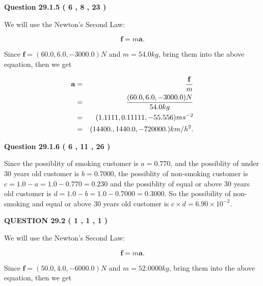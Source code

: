 \documentclass[12pt]{article}
\begin{document}
 
 
  
\vspace{0.2in}
  
{\textbf{\Large{Question
29.1.5 
 (           6 ,           8 ,          23 )
}}}
  
  
 
 

We will use the Newton's Second Law:
 
\[
\mathbf{f}=m\mathbf{a}.
\]
 
Since $\mathbf{f}=( %
60.0,  %
6.0,  %
-3000.0 )N$
and $m= %
54.0kg$, bring them into the above equation, then we get
 
\begin{eqnarray*}
\mathbf{a}&=&\frac{\mathbf{f}}m  \\
&=&\frac{(
60.0 ,
6.0 ,
-3000.0 )N
}{ %
54.0 kg}  \\
&=&(
1.1111 ,
0.11111,
-55.556
)ms^{-2} \\
&=&(
14400. ,
1440.0 ,
-720000.
)km/h^2.
\end{eqnarray*}
 
 
 
  
\vspace{0.2in}
  
{\textbf{\Large{Question
29.1.6 
 (           6 ,          11 ,          26 )
}}}
  
  
 
 

Since the possiblity of  %
smoking customer is $ a =  %
0.770 $,
and the possiblity of  %
 under 30 years old customer is $ b =  %
0.7000 $,
the possiblity of  %
non-smoking customer is $ c = 1.0 - a = 1.0 -
0.770
=  %
0.230 $ and the possiblity of  %
equal or above 30 years old
customer is $ d = 1.0 - b = 1.0 -  %
0.7000 =  %
0.3000  $.
So the possibility of  %
 non-smoking and  %
equal or above 30 years old
customer is $ c \times d =  %
6.90 \times 10^{-2} $.
 
 
 
  
\vspace{0.2in}
  
{\textbf{\Large{QUESTION
29.2 
 (           1 ,           1 ,           1 )
}}}
  
  


 
 

We will use the Newton's Second Law:
 
\[
\mathbf{f}=m\mathbf{a}.
\]
 
Since $\mathbf{f}= %
(50.0 , 4.0 , -6000.0) N$
and $m= %
52.0000kg$, bring them into the above equation, then we get
 
\end{document}
